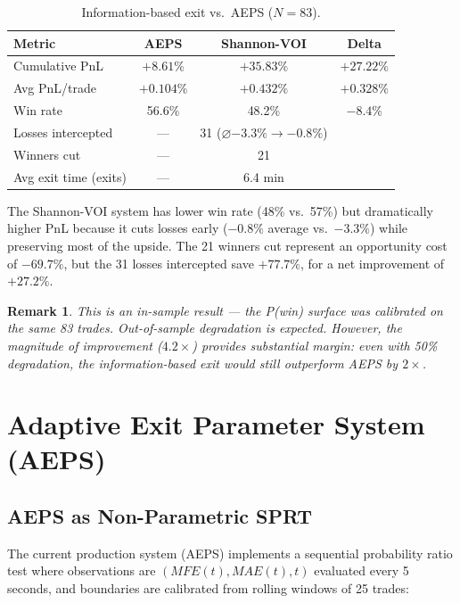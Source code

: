 \documentclass[11pt,a4paper]{article}
\newtheorem{remark}{Remark}[section]
\begin{document}
\begin{table}[H]
\centering
\caption{Information-based exit vs.\ AEPS ($N=83$).}
\begin{tabular}{lccc}
\toprule
\textbf{Metric} & \textbf{AEPS} & \textbf{Shannon-VOI} & \textbf{Delta} \\
\midrule
Cumulative PnL & $+8.61\%$ & $+35.83\%$ & $+27.22\%$ \\
Avg PnL/trade & $+0.104\%$ & $+0.432\%$ & $+0.328\%$ \\
Win rate & 56.6\% & 48.2\% & $-8.4\%$ \\
Losses intercepted & --- & 31 ($\varnothing$$-3.3\% \to -0.8\%$) & \\
Winners cut & --- & 21 & \\
Avg exit time (exits) & --- & 6.4 min & \\
\bottomrule
\end{tabular}
\end{table}

The Shannon-VOI system has lower win rate (48\% vs.\ 57\%) but dramatically higher PnL because it cuts losses early ($-0.8\%$ average vs.\ $-3.3\%$) while preserving most of the upside. The 21 winners cut represent an opportunity cost of $-69.7\%$, but the 31 losses intercepted save $+77.7\%$, for a net improvement of $+27.2\%$.

\begin{remark}
This is an in-sample result --- the P(win) surface was calibrated on the same 83 trades. Out-of-sample degradation is expected. However, the magnitude of improvement ($4.2\times$) provides substantial margin: even with 50\% degradation, the information-based exit would still outperform AEPS by $2\times$.
\end{remark}


\section{Adaptive Exit Parameter System (AEPS)}
\label{sec:aeps}

\subsection{AEPS as Non-Parametric SPRT}

The current production system (AEPS) implements a sequential probability ratio test where observations are $(MFE(t), MAE(t), t)$ evaluated every 5 seconds, and boundaries are calibrated from rolling windows of 25 trades:
\end{document}
